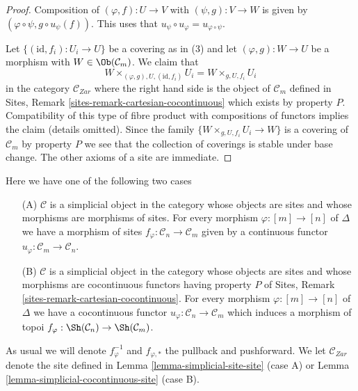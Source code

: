 \begin{proof}
Composition of $(\varphi, f) : U \to V$ with $(\psi, g) : V \to W$
is given by $(\varphi \circ \psi, g \circ u_\psi(f))$.
This uses that $u_\psi \circ u_\varphi = u_{\varphi \circ \psi}$.

\medskip\noindent
Let $\{(\text{id}, f_i) :  U_i \to U\}$ be a covering as in (3)
and let $(\varphi, g) : W \to U$ be a morphism with
$W \in \Ob(\mathcal{C}_m)$. We claim that
$$
W \times_{(\varphi, g), U, (\text{id}, f_i)} U_i =
W \times_{g, U, f_i} U_i
$$
in the category $\mathcal{C}_{Zar}$ where the right hand side
is the object of $\mathcal{C}_m$ defined in
Sites, Remark \ref{sites-remark-cartesian-cocontinuous}
which exists by property $P$. Compatibility of this type of fibre product
with compositions of functors implies the claim (details omitted).
Since the family $\{W \times_{g, U, f_i} U_i \to W\}$ is a
covering of $\mathcal{C}_m$ by property $P$ we see that
the collection of coverings is stable under base
change. The other axioms of a site are immediate.
\end{proof}

\begin{situation}
\label{situation-simplicial-site}
Here we have one of the following two cases
\begin{enumerate}
\item[(A)] $\mathcal{C}$ is a simplicial object in the category whose
objects are sites and whose morphisms are morphisms of sites. For every
morphism $\varphi : [m] \to [n]$ of $\Delta$ we have a morphism of sites
$f_\varphi : \mathcal{C}_n \to \mathcal{C}_m$ given by a continuous
functor $u_\varphi : \mathcal{C}_m \to \mathcal{C}_n$.
\item[(B)] $\mathcal{C}$ is a simplicial object in the category whose
objects are sites and whose morphisms are cocontinuous functors having
property $P$ of Sites, Remark \ref{sites-remark-cartesian-cocontinuous}.
For every morphism $\varphi : [m] \to [n]$ of $\Delta$ we have a cocontinuous
functor $u_\varphi : \mathcal{C}_n \to \mathcal{C}_m$ which induces a
morphism of topoi $f_\varphi : \Sh(\mathcal{C}_n) \to \Sh(\mathcal{C}_m)$.
\end{enumerate}
As usual we will denote $f_\varphi^{-1}$ and $f_{\varphi, *}$ the
pullback and pushforward. We let $\mathcal{C}_{Zar}$ denote the
site defined in
Lemma \ref{lemma-simplicial-site-site} (case A) or
Lemma \ref{lemma-simplicial-cocontinuous-site} (case B).
\end{situation}


